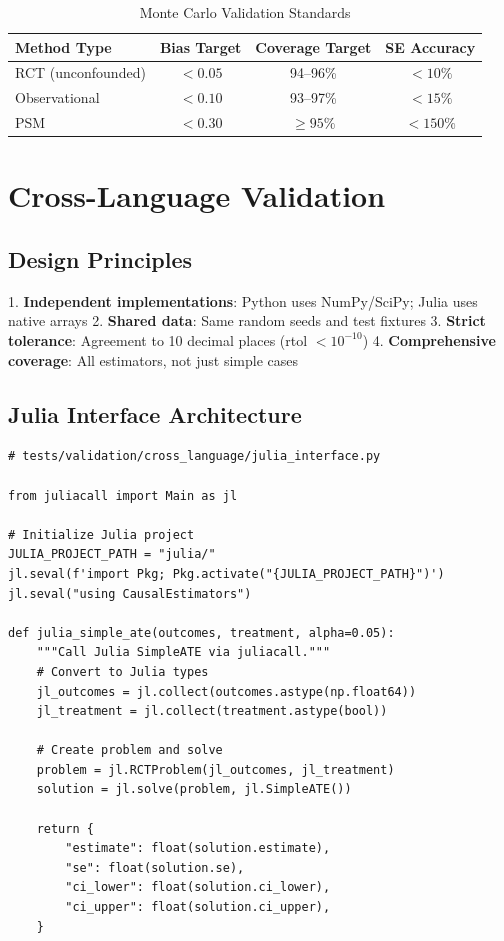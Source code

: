 \begin{table}[h]
\centering
\caption{Monte Carlo Validation Standards}
\begin{tabular}{lccc}
\toprule
Method Type & Bias Target & Coverage Target & SE Accuracy \\
\midrule
RCT (unconfounded) & $< 0.05$ & 94--96\% & $< 10\%$ \\
Observational & $< 0.10$ & 93--97\% & $< 15\%$ \\
PSM & $< 0.30$ & $\geq 95\%$ & $< 150\%$ \\
\bottomrule
\end{tabular}
\end{table}


\section{Cross-Language Validation}

\subsection{Design Principles}

1. \textbf{Independent implementations}: Python uses NumPy/SciPy; Julia uses native arrays
2. \textbf{Shared data}: Same random seeds and test fixtures
3. \textbf{Strict tolerance}: Agreement to 10 decimal places (rtol $< 10^{-10}$)
4. \textbf{Comprehensive coverage}: All estimators, not just simple cases

\subsection{Julia Interface Architecture}

\begin{verbatim}
# tests/validation/cross_language/julia_interface.py

from juliacall import Main as jl

# Initialize Julia project
JULIA_PROJECT_PATH = "julia/"
jl.seval(f'import Pkg; Pkg.activate("{JULIA_PROJECT_PATH}")')
jl.seval("using CausalEstimators")

def julia_simple_ate(outcomes, treatment, alpha=0.05):
    """Call Julia SimpleATE via juliacall."""
    # Convert to Julia types
    jl_outcomes = jl.collect(outcomes.astype(np.float64))
    jl_treatment = jl.collect(treatment.astype(bool))

    # Create problem and solve
    problem = jl.RCTProblem(jl_outcomes, jl_treatment)
    solution = jl.solve(problem, jl.SimpleATE())

    return {
        "estimate": float(solution.estimate),
        "se": float(solution.se),
        "ci_lower": float(solution.ci_lower),
        "ci_upper": float(solution.ci_upper),
    }
\end{verbatim}

